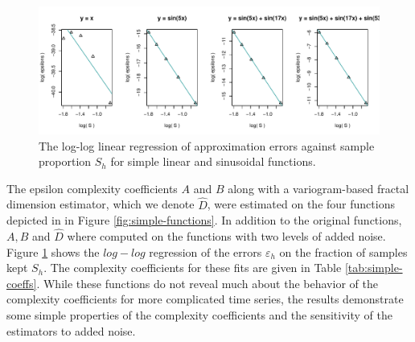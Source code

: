   \begin{figure}[h]
    \begin{center}
    \includegraphics[width = \textwidth, keepaspectratio]
    {./figs/coeff-interp-simple-fits.pdf}
    \end{center}
    \caption{The log-log linear regression
     of approximation errors against sample
     proportion $S_h$ for simple 
     linear and sinusoidal functions.}
    \label{fig:simple-fits}
  \end{figure}



The epsilon complexity coefficients $A$ and $B$ along with 
a variogram-based fractal dimension estimator, which 
we denote $\hat D$, were estimated on the four 
functions depicted in in Figure \ref{fig:simple-functions}. 
In addition to the original functions, $A,B$ and $\hat D$ where 
computed on the functions with two levels of added noise. 
Figure \ref{fig:simple-fits} 
shows the $log-log$ regression of the errors $\varepsilon_h$ 
on the fraction of samples kept $S_h$. The complexity coefficients for these fits are given in Table \ref{tab:simple-coeffs}. While these functions do not reveal much about the behavior of the complexity coefficients for more complicated time series, the results
demonstrate some simple properties of the complexity coefficients and 
the sensitivity of the estimators to added noise.

